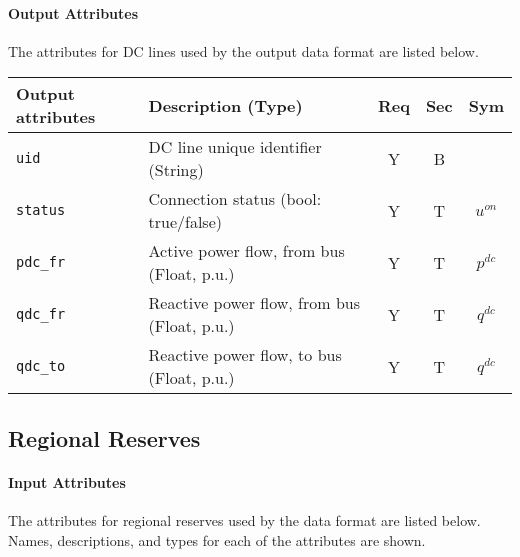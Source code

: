 \documentclass{article}
\begin{document}
\paragraph{Output Attributes}
 The attributes for DC lines
 used by the output data format are listed below.
\begin{center}
\small
\begin{tabular}{ l | l | c | c | c | }
Output attributes & Description (Type) & Req & Sec & Sym\\
\hline
  {\tt uid}    & DC line unique identifier (String)& Y & B & \\
  {\tt status} & Connection status (bool: true/false) & Y & T & $u^{on}$ \\
  {\tt pdc\_fr} & Active power flow, from bus (Float, p.u.)& Y & T & $p^{dc}$ \\
  {\tt qdc\_fr} & Reactive power flow, from bus (Float, p.u.)& Y & T & $q^{dc}$ \\
  {\tt qdc\_to} & Reactive power flow, to bus (Float, p.u.)& Y & T & $q^{dc}$ \\
  \hline
\end{tabular}
\end{center}

\subsection{Regional Reserves}
\label{nom:reserves}

\paragraph{Input Attributes}
The attributes for regional reserves
used by the data format are listed below.
Names, descriptions, and types for each of the attributes are shown.
\end{document}
